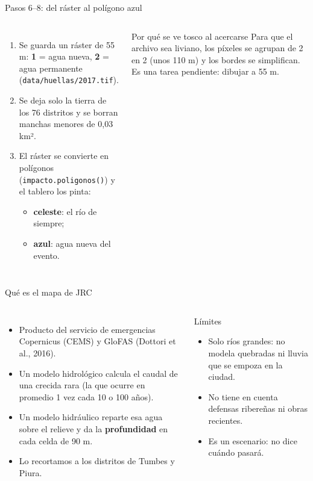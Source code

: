 \documentclass[aspectratio=169,11pt]{beamer}
\begin{document}
\begin{frame}{Pasos 6--8: del ráster al polígono azul}
\begin{columns}[T]
\small
\begin{enumerate}\setlength\itemsep{4pt}
\item[6.] Se guarda un ráster de 55 m: \textbf{1} = agua nueva, \textbf{2} = agua permanente (\texttt{data/huellas/2017.tif}).
\item[7.] Se deja solo la tierra de los 76 distritos y se borran manchas menores de 0,03 km².
\item[8.] El ráster se convierte en polígonos (\texttt{impacto.poligonos()}) y el tablero los pinta:
  \begin{itemize}
  \item \textcolor{celeste!70!black}{\textbf{celeste}}: el río de siempre;
  \item \textcolor{azulc}{\textbf{azul}}: agua nueva del evento.
  \end{itemize}
\end{enumerate}
\begin{alertblock}{Por qué se ve tosco al acercarse}
\small Para que el archivo sea liviano, los píxeles se agrupan de 2 en 2 (unos 110 m) y los bordes se simplifican. Es una tarea pendiente: dibujar a 55 m.
\end{alertblock}
\end{columns}
\end{frame}

\begin{frame}{Qué es el mapa de JRC}
\begin{columns}[T]
\small
\begin{itemize}\setlength\itemsep{4pt}
\item Producto del servicio de emergencias Copernicus (CEMS) y GloFAS (Dottori et al., 2016).
\item Un modelo hidrológico calcula el caudal de una crecida rara (la que ocurre en promedio 1 vez cada 10 o 100 años).
\item Un modelo hidráulico reparte esa agua sobre el relieve y da la \textbf{profundidad} en cada celda de 90 m.
\item Lo recortamos a los distritos de Tumbes y Piura.
\end{itemize}
\begin{alertblock}{Límites}
\small
\begin{itemize}
\item Solo ríos grandes: no modela quebradas ni lluvia que se empoza en la ciudad.
\item No tiene en cuenta defensas ribereñas ni obras recientes.
\item Es un escenario: no dice cuándo pasará.
\end{itemize}
\end{alertblock}
\end{columns}
\end{frame}
\end{document}
